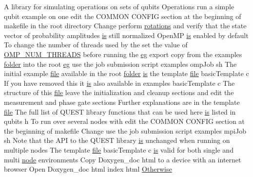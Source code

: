 \begin{DoxyCompactItemize}
A library for simulating operations on sets of qubits Operations run a simple qubit example on one edit the COMMON CONFIG section at the beginning of makefile in the root directory Change perform \hyperlink{README_8md_a168d0f076329da35a2b080049c35cecd}{rotations} and verify that the state vector of probability amplitudes \hyperlink{README_8md_ac361bc388656077907485b42e1531a85}{is} still normalized OpenMP \hyperlink{README_8md_ac361bc388656077907485b42e1531a85}{is} enabled by default To change the number of threads used by the set the value of \hyperlink{README_8md_ac0f875e6c5b5526a6781e0fbba81e6a4}{OMP\_\-NUM\_\-THREADS} before running the \hyperlink{README_8md_a60a90a09308ad7ec0ea2ac389281518b}{eg} export copy from the examples \hyperlink{README_8md_ac5527449269e33be598e819921cd9e43}{folder} into the root \hyperlink{README_8md_a60a90a09308ad7ec0ea2ac389281518b}{eg} use the job submission script examples ompJob sh The initial example \hyperlink{README_8md_a5078360f0afc4e756290c3197d1abfe9}{file} available in the root \hyperlink{README_8md_ac5527449269e33be598e819921cd9e43}{folder} \hyperlink{README_8md_ac361bc388656077907485b42e1531a85}{is} the template \hyperlink{README_8md_a5078360f0afc4e756290c3197d1abfe9}{file} basicTemplate c If you have removed this it \hyperlink{README_8md_ac361bc388656077907485b42e1531a85}{is} also available in examples basicTemplate c The structure of this \hyperlink{README_8md_a5078360f0afc4e756290c3197d1abfe9}{file} leave the initialization and cleanup sections and edit the measurement and phase gate sections Further explanations are in the template \hyperlink{README_8md_a5078360f0afc4e756290c3197d1abfe9}{file} The full list of QUEST library functions that can be used here \hyperlink{README_8md_ac361bc388656077907485b42e1531a85}{is} listed in qubits h To run over several nodes with edit the COMMON CONFIG section at the beginning of makefile Change use the job submission script examples mpiJob sh Note that the API to the QUEST library \hyperlink{README_8md_ac361bc388656077907485b42e1531a85}{is} unchanged when running on multiple nodes The template \hyperlink{README_8md_a5078360f0afc4e756290c3197d1abfe9}{file} basicTemplate c \hyperlink{README_8md_ac361bc388656077907485b42e1531a85}{is} valid for both single and multi \hyperlink{README_8md_a99a33b7cbd048786ffbadbc8d8996086}{node} environments Copy Doxygen\_\-doc html to a device with an internet browser Open Doxygen\_\-doc html index html \hyperlink{README_8md_a1609f0bb178c72f20123669240bf1831}{Otherwise}
\end{DoxyCompactItemize}


